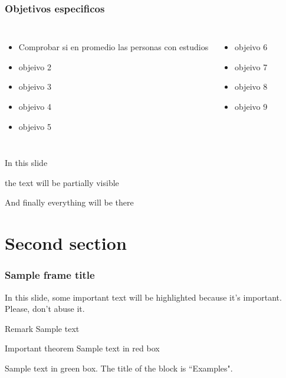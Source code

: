 \documentclass{beamer}
\begin{document}
\begin{frame}
\frametitle{Objetivos especificos}
\begin{columns}

\begin{itemize}
    \item Comprobar si \alert{en promedio} las personas con
    estudios
    \item objeivo 2
    \item objeivo 3
    \item objeivo 4
    \item objeivo 5
\end{itemize}


\begin{itemize}
    \item objeivo 6
    \item objeivo 7
    \item objeivo 8
    \item objeivo 9
\end{itemize}
\end{columns}

\end{frame}



\begin{frame}
In this slide \pause

the text will be partially visible \pause

And finally everything will be there
\end{frame}

\section{Second section}

\begin{frame}
\frametitle{Sample frame title}

In this slide, some important text will be
\alert{highlighted} because it's important.
Please, don't abuse it.

\begin{block}{Remark}
Sample text
\end{block}

\begin{alertblock}{Important theorem}
Sample text in red box
\end{alertblock}

\begin{examples}
Sample text in green box. The title of the block is ``Examples".
\end{examples}
\end{frame}
\end{document}
